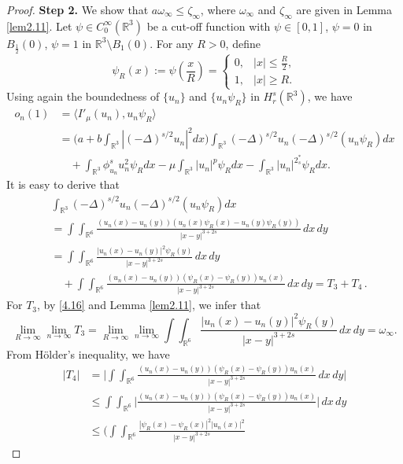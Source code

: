 \documentclass[11pt]{article}
\numberwithin{equation}{section}
\begin{document}
\begin{proof}
\noindent\textbf{Step 2.}
We show that $a\omega_\infty\leq\zeta_\infty$, where $\omega_\infty$ and
$\zeta_\infty$ are given in Lemma \ref{lem2.11}.
Let $\psi \in C^\infty_0(\mathbb{R}^3)$ be a cut-off function with $\psi \in[0,1]$,
$\psi=0$ in $B_{\frac{1}{2}}(0)$, $\psi=1$ in $\mathbb{R}^3\setminus B_1(0)$.
For any $R>0$, define
\[
\psi_R(x):=\psi\left(\frac{x}{R}\right) =
\begin{cases}
0, & |x|\leq \frac{R}{2}, \\
1, & |x|\geq {R}.
\end{cases}
\]
Using again the boundedness of $\{u_n\}$ and $\{u_n\psi_R\}$ in $H^s_{r}(\mathbb{R}^3)$,
we have
\begin{equation}\label{4.24}
\begin{split}
o_n(1)
&= \langle I'_\mu(u_n), u_n\psi_R \rangle\\
&= \Big(a+b\int_{\mathbb{R}^3}|(-\Delta)^{s/2}u_n|^2dx\Big)
 \int_{\mathbb{R}^3}(-\Delta)^{s/2}u_n(-\Delta)^{s/2}(u_n\psi_R)dx\\
&\quad +\int_{\mathbb{R}^3}\phi^s_{u_n} u^2_n\psi_R dx
 -\mu \int_{\mathbb{R}^3}|u_n|^p\psi_R  dx-\int_{\mathbb{R}^3}|u_n|^{2^*_s}\psi_R  dx.
\end{split}
\end{equation}
It is easy to derive that
\[
\begin{split}
&\int_{\mathbb{R}^3}(-\Delta)^{s/2}u_n
(-\Delta)^{s/2}(u_n\psi_R)dx\\
&= \int\int_{\mathbb{R}^6}\frac{(u_n(x)-u_n(y))(u_n(x)\psi_R(x)-u_n(y)\psi_R(y))}{|x-y|^{3+2s}}\,dx\,dy\\
&= \int\int_{\mathbb{R}^6}\frac{|u_n(x)-u_n(y)|^2\psi_R(y)}{|x-y|^{3+2s}}\,dx\,dy\\
&\quad+\int\int_{\mathbb{R}^6}\frac{(u_n(x)-u_n(y))(\psi_R(x)-\psi_R(y))u_n(x)}{|x-y|^{3+2s}}\,dx\,dy
=T_3+T_4\,.
\end{split}
\]
For $T_3$, by \eqref{4.16} and Lemma \ref{lem2.11}, we infer that
\[
\lim_{R\to \infty}\lim_{n\to\infty}T_3
= \lim_{R\to \infty}\lim_{n\to\infty}\int\int_{\mathbb{R}^6}
\frac{|u_n(x)-u_n(y)|^2\psi_R(y)}{|x-y|^{3+2s}}\,dx\,dy
=\omega_\infty.
\]
From H\"older's inequality, we have
\begin{align*}
|T_4|
&= \Big|\int\int_{\mathbb{R}^6}\frac{(u_n(x)-u_n(y))(\psi_R(x)
 -\psi_R(y))u_n(x)}{|x-y|^{3+2s}}\,dx\,dy\Big|\\
&\leq \int\int_{\mathbb{R}^6}
 \Big|\frac{(u_n(x)-u_n(y))(\psi_R(x)-\psi_R(y))u_n(x)}{|x-y|^{3+2s}}\Big|\,dx\,dy\\
&\leq \Big(\int\int_{\mathbb{R}^6}\frac{|\psi_R(x)-\psi_R(x)|^2|u_{n}(x)|^2}{|x-y|^{3+2s}}

\end{align*}
\end{proof}
\end{document}
